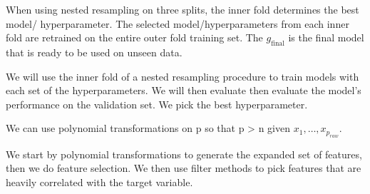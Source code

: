 \documentclass[12pt]{article}
\begin{document}
\begin{enumerate}
When using nested resampling on three splits, the inner fold determines the best model/ hyperparameter. The selected model/hyperparameters from each inner fold are retrained on the entire outer fold training set. The $g_{\text{final}}$ is the final model that is ready to be used on unseen data.


We will use the inner fold of a nested resampling procedure to train models with each set of the hyperparameters. We will then evaluate then evaluate the model's performance on the validation set. We pick the best hyperparameter.


We can use polynomial transformations on p so that p > n given $x_1, \ldots, x_{p_{raw}}$.


We start by polynomial transformations to generate the expanded set of features, then we do feature selection. We then use filter methods to pick features that are heavily correlated with the target variable.

\end{enumerate}



\end{document}
